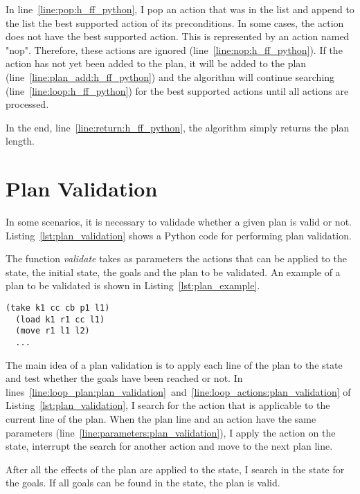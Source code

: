 \documentclass[letterpaper]{article}
\begin{document}
In line~\ref{line:pop:h_ff_python}, I pop an action that was in the list and append to the list the best supported action of its preconditions. In some cases, the action does not have the best supported action. This is represented by an action named "nop". Therefore, these actions are ignored (line~\ref{line:nop:h_ff_python}). If the action has not yet been added to the plan, it will be added to the plan (line~\ref{line:plan_add:h_ff_python}) and the algorithm will continue searching (line~\ref{line:loop:h_ff_python}) for the best supported actions until all actions are processed.

In the end, line~\ref{line:return:h_ff_python}, the algorithm simply returns the plan length.

\section{Plan Validation}

In some scenarios, it is necessary to validade whether a given plan is valid or not. Listing~\ref{lst:plan_validation} shows a Python code for performing plan validation.



The function \textit{validate} takes as parameters the actions that can be applied to the state, the initial state, the goals and the plan to be validated. An example of a plan to be validated is shown in Listing~\ref{lst:plan_example}.

\begin{lstlisting}[label=lst:plan_example, caption={Example of a plan}, captionpos=b]
  (take k1 cc cb p1 l1)
  (load k1 r1 cc l1)
  (move r1 l1 l2)
  ...
\end{lstlisting}

The main idea of a plan validation is to apply each line of the plan to the state and test whether the goals have been reached or not. In lines~\ref{line:loop_plan:plan_validation}~and~\ref{line:loop_actions:plan_validation} of Listing~\ref{lst:plan_validation}, I search for the action that is applicable to the current line of the plan. When the plan line and an action have the same parameters (line~\ref{line:parameters:plan_validation}), I apply the action on the state, interrupt the search for another action and move to the next plan line.

After all the effects of the plan are applied to the state, I search in the state for the goals. If all goals can be found in the state, the plan is valid.
\end{document}
